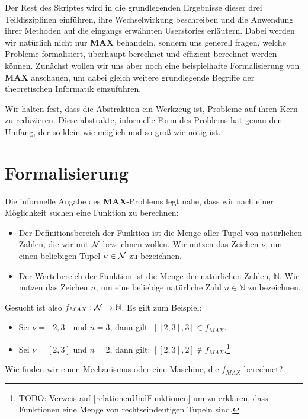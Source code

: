 Der Rest des Skriptes wird in die grundlegenden Ergebnisse dieser drei Teildisziplinen einführen,
ihre Wechselwirkung beschreiben
und die Anwendung ihrer Methoden auf die eingangs erwähnten Userstories erläutern.
Dabei werden wir natürlich nicht nur \textbf{MAX} behandeln, sondern uns generell fragen,
welche Probleme formalisiert, überhaupt berechnet und effizient berechnet werden können.
Zunächst wollen wir uns aber noch eine beispielhafte Formalisierung von \textbf{MAX}
anschauen, um dabei gleich weitere grundlegende Begriffe der theoretischen Informatik
einzuführen.

Wir halten fest, dass die Abstraktion ein Werkzeug ist,
Probleme auf ihren Kern zu reduzieren.
Diese abstrakte, informelle Form des Problems hat genau den Umfang,
der so klein wie möglich und so groß wie nötig ist.

\section{Formalisierung}
\noindent
Die informelle Angabe des \textbf{MAX}-Problems legt nahe, dass wir nach einer Möglichkeit suchen
eine Funktion zu berechnen:
\begin{itemize}
    \item Der Definitionsbereich der Funktion ist die Menge aller Tupel von natürlichen Zahlen,
        die wir mit $\cal{N}$ bezeichnen wollen.
        Wir nutzen das Zeichen $\nu$,
        um einen beliebigen Tupel $\nu \in \cal{N}$ zu bezeichnen.
    \item Der Wertebereich der Funktion ist die Menge der natürlichen Zahlen, $\mathbb{N}$.
        Wir nutzen das Zeichen $n$,
        um eine beliebige natürliche Zahl $n \in \mathbb{N}$ zu bezeichnen.
\end{itemize}
Gesucht ist also $f_{MAX}: \cal{N} \rightarrow \mathbb{N}$.
Es gilt zum Beispiel:
\begin{itemize}
    \item Sei $\nu = [2,3]$ und $n = 3$,
        dann gilt: $[[2,3],3] \in f_{MAX}$.
    \item Sei $\nu = [2,3]$ und $n = 2$,
        dann gilt: $[[2,3],2] \notin f_{MAX}$.\footnote{
            TODO: Verweis auf \ref{relationenUndFunktionen} um zu erklären,
            dass Funktionen eine Menge von rechtseindeutigen Tupeln sind.}
\end{itemize}

\noindent
Wie finden wir einen Mechanismus oder eine Maschine, die $f_{MAX}$ berechnet?

